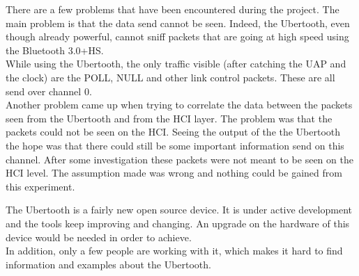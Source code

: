 \label{subsec:problems}
There are a few problems that have been encountered during the project. 
The main problem is that the data send cannot be seen. Indeed, the Ubertooth, even though already powerful, cannot sniff packets that are going at high speed using the Bluetooth 3.0+HS. \\
While using the Ubertooth, the only traffic visible (after catching the UAP and the clock) are the POLL, NULL and other link control packets. These are all send over channel 0.\\
Another problem came up when trying to correlate the data between the packets seen from the Ubertooth and from the HCI layer. The problem was that the packets could not be seen on the HCI. Seeing the output of the the Ubertooth the hope was that there could still be some important information send on this channel. After some investigation these packets were not meant to be seen on the HCI level. The assumption made was wrong and nothing could be gained from this experiment.

The Ubertooth is a fairly new open source device. It is under active development and the tools keep improving and changing. An upgrade on the hardware of this device would be needed in order to achieve. \\
In addition, only a few people are working with it, which makes it hard to find information and examples about the Ubertooth.